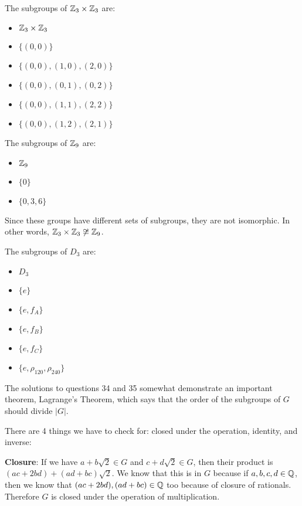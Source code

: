 \documentclass[12pt]{report}
\begin{document}
\sol The subgroups of $\ZZ_3 \times \ZZ_3$ are:
\begin{itemize}
    \item $\ZZ_3 \times \ZZ_3$
    \item $\{ (0,0) \}$
    \item $\{ (0,0), (1, 0), (2, 0)\}$
    \item $\{ (0,0), (0, 1), (0, 2)\}$
    \item $\{ (0,0), (1, 1), (2, 2)\}$
    \item $\{ (0,0), (1, 2), (2, 1)\}$
\end{itemize}

The subgroups of $\ZZ_9$ are: 
\begin{itemize}
    \item $\ZZ_9$
    \item $\{ 0 \}$
    \item $\{ 0, 3, 6 \}$
\end{itemize}

\noindent Since these groups have different sets of subgroups, they are not isomorphic. In other words, $\ZZ_3 \times \ZZ_3 \not \cong \ZZ_9$.

\sol The subgroups of $D_3$ are:
\begin{itemize}
    \item $D_3$
    \item $\{ e \}$
    \item $\{e, f_A \}$
    \item $\{e, f_B \}$
    \item $\{e, f_C \}$
    \item ${\{ e, \rho_{120}, \rho_{240} \}}$
\end{itemize}

\noindent The solutions to questions 34 and 35 somewhat demonstrate an important theorem, Lagrange's Theorem, which says that the order of the subgroups of $G$ should divide $|G|$. 

\sol There are 4 things we have to check for: closed under the operation, identity, and inverse:

\textbf{Closure}: If we have $a + b\sqrt{2} \in G$ and $c + d\sqrt{2} \in G$, then their product is $(ac + 2bd) + (ad + bc)\sqrt{2}$. We know that this is in $G$ because if $a,b,c,d \in \QQ$, then we know that $(ac+2bd),(ad+bc) \in \QQ$ too because of closure of rationals. Therefore $G$ is closed under the operation of multiplication.
\end{document}
